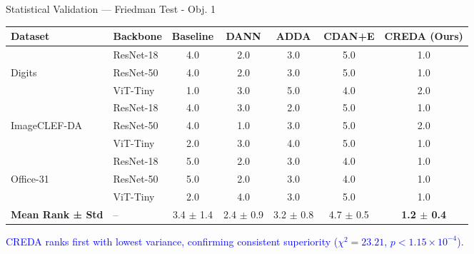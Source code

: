 \documentclass[aspectratio=169]{beamer}
\begin{document}
\begin{frame}{Statistical Validation — Friedman Test - Obj. 1}
\begin{table}
\footnotesize
\begin{tabularx}{\linewidth}{llccccc}
\toprule
\textbf{Dataset} & \textbf{Backbone} & \textbf{Baseline} & \textbf{DANN} & \textbf{ADDA} & \textbf{CDAN+E} & \textbf{CREDA (Ours)} \\
\midrule
 & ResNet-18 & 4.0 & 2.0 & 3.0 & 5.0 & 1.0 \\
Digits & ResNet-50 & 4.0 & 2.0 & 3.0 & 5.0 & 1.0 \\
 & ViT-Tiny  & 1.0 & 3.0 & 5.0 & 4.0 & 2.0 \\
\midrule
& ResNet-18 & 4.0 & 3.0 & 2.0 & 5.0 & 1.0 \\
ImageCLEF-DA & ResNet-50 & 4.0 & 1.0 & 3.0 & 5.0 & 2.0 \\
 & ViT-Tiny  & 2.0 & 3.0 & 4.0 & 5.0 & 1.0 \\
\midrule
 & ResNet-18 & 5.0 & 2.0 & 3.0 & 4.0 & 1.0 \\
Office-31 & ResNet-50 & 5.0 & 2.0 & 3.0 & 4.0 & 1.0 \\
 & ViT-Tiny  & 2.0 & 4.0 & 3.0 & 5.0 & 1.0 \\
\midrule
\textbf{Mean Rank ± Std%
} & -- & 3.4 $\pm$ 1.4 & 2.4 $\pm$ 0.9 & 3.2 $\pm$ 0.8 & 4.7 $\pm$ 0.5 & \textbf{1.2 $\pm$ 0.4} %
\\
\bottomrule
\end{tabularx}
\end{table}
\begin{center}
    \textcolor{blue}{CREDA ranks first with lowest variance, confirming consistent superiority \tiny($\chi^2 = 23.21$, $p < 1.15\times10^{-4} $)}.
\end{center}
\end{frame}


\end{document}
